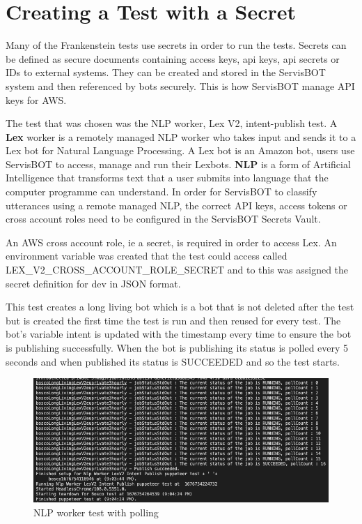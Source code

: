 \documentclass[12pt,a4paper,titlepage]{report}
\begin{document}
\section{Creating a Test with a Secret}
Many of the Frankenstein tests use secrets in order to run the tests. Secrets can be defined as secure documents containing access keys, api keys, api secrets or IDs to external systems. They can be created and stored in the ServisBOT system and then referenced by bots securely. This is how ServisBOT manage API keys for AWS.

The test that was chosen was the NLP worker, Lex V2, intent-publish test. A \textbf{Lex} worker is a remotely managed NLP worker who takes input and sends it to a Lex bot for Natural Language Processing. A Lex bot is an Amazon bot, users use ServisBOT to access, manage and run their Lexbots. 
\textbf{NLP} is a form of Artificial Intelligence that transforms text that a user submits into language that the computer programme can understand. In order for ServisBOT to classify utterances using a remote managed NLP, the correct API keys, access tokens or cross account roles need to be configured in the ServisBOT Secrets Vault.

An AWS cross account role, ie a secret, is required in order to access Lex. An environment variable was created that the test could access called LEX\_V2\_CROSS\_ACCOUNT\_ROLE\_SECRET and to this was assigned the secret definition for dev in JSON format. 

This test creates a long living bot which is a bot that is not deleted after the test but is created the first time the test is run and then reused for every test. The bot's variable intent is updated with the timestamp every time to ensure the bot is publishing successfully. When the bot is publishing its status is polled every 5 seconds and when published its status is SUCCEEDED and so the test starts.

\begin{figure}[h]
  \centering
  \includegraphics[width=15cm]{./diagrams/nlp_worker_poll.png}
  \caption{NLP worker test with polling}
\end{figure}
\end{document}
